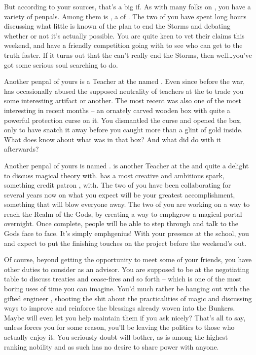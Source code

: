 \documentclass[char]{GL2020}
\begin{document}
But according to your sources, that’s a big if. As with many folks on \pEarth{}, you have a variety of penpals. Among them is \cHedonist{}, a \cHedonist{\cleric} of \cFarmGod{}. The two of you have spent long hours discussing what little is known of the \pTech{} plan to end the Storms and debating whether or not it’s actually possible. You are quite keen to vet their claims this weekend, and have a friendly competition going with \cHedonist{} to see who can get to the truth faster. If it turns out that the \pTech{} can’t really end the Storms, then well\ldots you’ve got some serious soul searching to do.

Another penpal of yours is a Teacher at the \pSc{} named \cChupSecond{}. Even since before the war, \cChupSecond{} has occasionally abused the supposed neutrality of teachers at the \pSc{} to trade you some interesting artifact \cChupSecond{\they} \cChupSecond{\have} or another. The most recent was also one of the most interesting in recent months -- an ornately carved wooden box with quite a powerful protection curse on it. You dismantled the curse and opened the box, only to have \cChupSecond{} snatch it away before you caught more than a glint of gold inside. What does \cChupSecond{} know about what was in that box? And what did \cChupSecond{\they} do with it afterwards?

Another penpal of yours is named \cFlowPriest{}. \cFlowPriest{} is another Teacher at the \pSchool{} and quite a delight to discuss magical theory with. \cFlowPriest{} has a most creative and ambitious spark, something \cFlowPriest{\they} credit  patron \cFlow{\diety}, \cFlowFull{} with. The two of you have been collaborating for several years now on what you expect will be your greatest accomplishment, something that will blow everyone away. The two of you are working on a way to reach the Realm of the Gods, by creating a way to emph{grow} a magical portal overnight. Once complete, people will be able to step through and talk to the Gods face to face. It’s simply emph{genius}! With your presence at the school, you and \cFlowPriest{} expect to put the finishing touches on the project before the weekend’s out.

Of course, beyond getting the opportunity to meet some of your friends, you have other duties to consider as an advisor. You are supposed to be at the negotiating table to discuss treaties and cease-fires and so forth -- which is one of the most boring uses of time you can imagine. You’d much rather be hanging out with the gifted engineer \cBunker{}, shooting the shit about the practicalities of magic and discussing ways to improve and reinforce the blessings already woven into the Bunkers. Maybe \cBunker{\they} will even let you help maintain them if you ask nicely? That’s all to say, unless \cEvil{} forces you for some reason, you’ll be leaving the politics to those who actually enjoy it. You seriously doubt \cEvil{\they} will bother, as \cEvil{} is among the highest ranking nobility and as such has no desire to share power with anyone.
\end{document}
